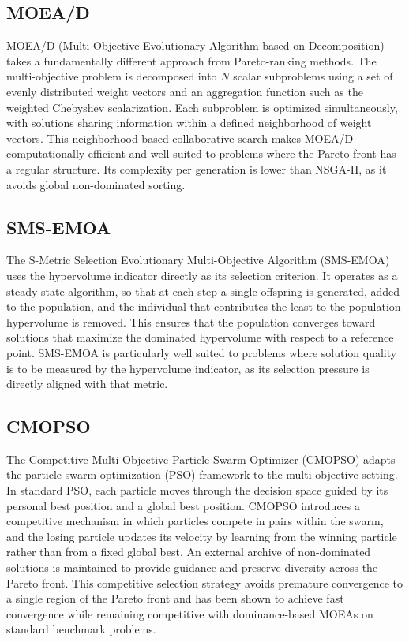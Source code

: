 \subsection{MOEA/D}
\label{subsubsec:moead}

MOEA/D (Multi-Objective Evolutionary Algorithm based on Decomposition) takes a fundamentally different approach from Pareto-ranking methods. The
multi-objective problem is decomposed into $N$ scalar subproblems using a set of evenly distributed weight vectors and an aggregation function such as
the weighted Chebyshev scalarization. Each subproblem is optimized simultaneously, with solutions sharing information within a defined neighborhood
of weight vectors. This neighborhood-based collaborative search makes MOEA/D computationally efficient and well suited to problems where the Pareto
front has a regular structure. Its complexity per generation is lower than NSGA-II, as it avoids global non-dominated sorting.~\cite{moead, pymoo}

\subsection{SMS-EMOA}
\label{subsubsec:smsemoa}

The S-Metric Selection Evolutionary Multi-Objective Algorithm (SMS-EMOA) uses the hypervolume indicator directly as its selection criterion. It
operates as a steady-state algorithm, so that at each step a single offspring is generated, added to the population, and the individual that
contributes the least to the population hypervolume is removed. This ensures that the population converges toward solutions that maximize the
dominated hypervolume with respect to a reference point. SMS-EMOA is particularly well suited to problems where solution quality is to be measured by
the hypervolume indicator, as its selection pressure is directly aligned with that metric.~\cite{smsemoa}

\subsection{CMOPSO}
\label{subsubsec:cmopso}

The Competitive Multi-Objective Particle Swarm Optimizer (CMOPSO) adapts the particle swarm optimization (PSO) framework to the multi-objective
setting. In standard PSO, each particle moves through the decision space guided by its personal best position and a global best position. CMOPSO
introduces a competitive mechanism in which particles compete in pairs within the swarm, and the losing particle updates its velocity by learning from
the winning particle rather than from a fixed global best. An external archive of non-dominated solutions is maintained to provide guidance and
preserve diversity across the Pareto front. This competitive selection strategy avoids premature convergence to a single region of the Pareto front
and has been shown to achieve fast convergence while remaining competitive with dominance-based MOEAs on standard benchmark problems.~\cite{cmopso}


